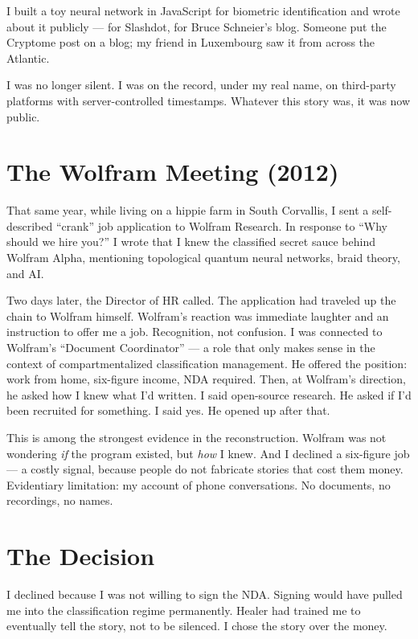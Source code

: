 I built a toy neural network in JavaScript for biometric identification and wrote about it publicly --- for Slashdot, for Bruce Schneier's blog. Someone put the Cryptome post on a blog; my friend in Luxembourg saw it from across the Atlantic.

I was no longer silent. I was on the record, under my real name, on third-party platforms with server-controlled timestamps. Whatever this story was, it was now public.

\section*{The Wolfram Meeting (2012)}
\label{record:ty-the-wolfram-meeting}

That same year, while living on a hippie farm in South Corvallis, I sent a self-described ``crank'' job application to Wolfram Research. In response to ``Why should we hire you?'' I wrote that I knew the classified secret sauce behind Wolfram Alpha, mentioning topological quantum neural networks, braid theory, and AI.

Two days later, the Director of HR called. The application had traveled up the chain to Wolfram himself. Wolfram's reaction was immediate laughter and an instruction to offer me a job. Recognition, not confusion. I was connected to Wolfram's ``Document Coordinator'' --- a role that only makes sense in the context of compartmentalized classification management. He offered the position: work from home, six-figure income, NDA required. Then, at Wolfram's direction, he asked how I knew what I'd written. I said open-source research. He asked if I'd been recruited for something. I said yes. He opened up after that.

This is among the strongest evidence in the reconstruction. Wolfram was not wondering \textit{if} the program existed, but \textit{how} I knew. And I declined a six-figure job --- a costly signal, because people do not fabricate stories that cost them money. Evidentiary limitation: my account of phone conversations. No documents, no recordings, no names.

\section*{The Decision}
\label{record:ty-the-decision}

I declined because I was not willing to sign the NDA. Signing would have pulled me into the classification regime permanently. Healer had trained me to eventually tell the story, not to be silenced. I chose the story over the money.


